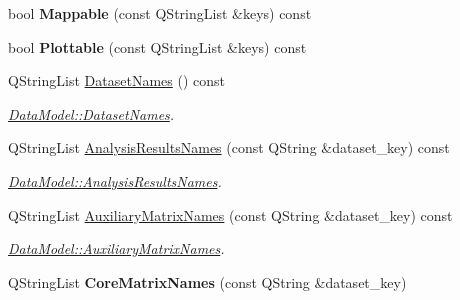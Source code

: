 \begin{DoxyCompactItemize}
\item 
bool {\bfseries Mappable} (const Q\+String\+List \&keys) const \hypertarget{class_data_model_a84b028bda5d4bf5719769164b32bdfc8}{}\label{class_data_model_a84b028bda5d4bf5719769164b32bdfc8}

\item 
bool {\bfseries Plottable} (const Q\+String\+List \&keys) const \hypertarget{class_data_model_ab41d55c9e713496d8f1eaecb8d37f546}{}\label{class_data_model_ab41d55c9e713496d8f1eaecb8d37f546}

\item 
Q\+String\+List \hyperlink{class_data_model_ae8e2a93a6c71ca636957faa8208eb6cc}{Dataset\+Names} () const 
\begin{DoxyCompactList}\small\item\em \hyperlink{class_data_model_ae8e2a93a6c71ca636957faa8208eb6cc}{Data\+Model\+::\+Dataset\+Names}. \end{DoxyCompactList}\item 
Q\+String\+List \hyperlink{class_data_model_a70071e275893667961ff4262f8d28c9e}{Analysis\+Results\+Names} (const Q\+String \&dataset\+\_\+key) const 
\begin{DoxyCompactList}\small\item\em \hyperlink{class_data_model_a70071e275893667961ff4262f8d28c9e}{Data\+Model\+::\+Analysis\+Results\+Names}. \end{DoxyCompactList}\item 
Q\+String\+List \hyperlink{class_data_model_a4086ff5d73459e7499f6f939e0ab3684}{Auxiliary\+Matrix\+Names} (const Q\+String \&dataset\+\_\+key) const 
\begin{DoxyCompactList}\small\item\em \hyperlink{class_data_model_a4086ff5d73459e7499f6f939e0ab3684}{Data\+Model\+::\+Auxiliary\+Matrix\+Names}. \end{DoxyCompactList}\item 
Q\+String\+List {\bfseries Core\+Matrix\+Names} (const Q\+String \&dataset\+\_\+key)\hypertarget{class_data_model_a92c4ff18028cdac1ee4f82fa96a571ca}{}\label{class_data_model_a92c4ff18028cdac1ee4f82fa96a571ca}


\end{DoxyCompactItemize}
